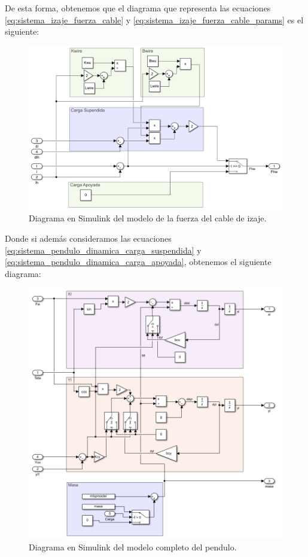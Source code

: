 \documentclass[11pt]{article}
\begin{document}
De esta forma, obtenemos que el diagrama que representa las ecuaciones \ref{eq:sistema_izaje_fuerza_cable} y \ref{eq:sistema_izaje_fuerza_cable_params} es el siguiente:

\begin{figure}[h!]
	\centering
	\includegraphics[width=1\textwidth]{images/imagen_9_sistema_pendulo_dinamica.png}
	\caption{Diagrama en Simulink del modelo de la fuerza del cable de izaje.}
	\label{fig:sistema_pendulo_dinamica}
\end{figure}

Donde si además consideramos las ecuaciones \ref{eq:sistema_pendulo_dinamica_carga_suspendida} y \ref{eq:sistema_pendulo_dinamica_carga_apoyada}, obtenemos el siguiente diagrama:

\begin{figure}[h!]
	\centering
	\includegraphics[width=1\textwidth]{images/imagen_10_sistema_pendulo_cinematica_dinamica.png}
	\caption{Diagrama en Simulink del modelo completo del pendulo.}
	\label{fig:sistema_pendulo_cinematica_dinamica}
\end{figure}
\end{document}
